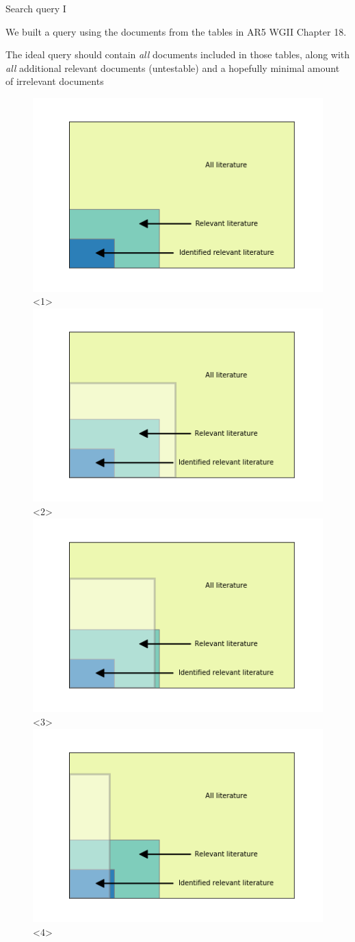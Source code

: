 \documentclass[9pt]{beamer}
\begin{document}
\begin{frame}{Search query I}

We built a query using the documents from the tables in AR5 WGII Chapter 18.

The ideal query should contain \textit{all} documents included in those tables, along with \textit{all} additional relevant documents (untestable) and a hopefully minimal amount of irrelevant documents

\begin{figure}
	\includegraphics[width=0.7\linewidth]{../plots/basic_lit_plot.png}<1>
	\includegraphics[width=0.7\linewidth]{../plots/lit_plot_query_1.png}<2>
	\includegraphics[width=0.7\linewidth]{../plots/lit_plot_query_3.png}<3>
	\includegraphics[width=0.7\linewidth]{../plots/lit_plot_query_2.png}<4>

\end{figure}
\end{frame}
\end{document}
